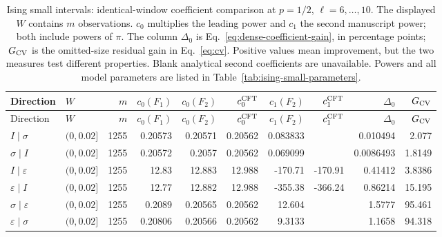 \begingroup\setlength{\tabcolsep}{2pt}
\begin{longtable}{llrrrrrrrr}
\caption{Ising small intervals: identical-window coefficient comparison at $p=1/2$, $\ell=6,\ldots,10$. The displayed $W$ contains $m$ observations. $c_0$ multiplies the leading power and $c_1$ the second manuscript power; both include powers of $\pi$. The column $\Delta_0$ is Eq.~\eqref{eq:dense-coefficient-gain}, in percentage points; $G_{\rm CV}$ is the omitted-size residual gain in Eq.~\eqref{eq:cv}. Positive values mean improvement, but the two measures test different properties. Blank analytical second coefficients are unavailable. Powers and all model parameters are listed in Table~\ref{tab:ising-small-parameters}.}
\label{tab:dense-small-ising}\\\toprule
Direction & $W$ & $m$ & $c_0(F_1)$ & $c_0(F_2)$ & $c_0^{\rm CFT}$ & $c_1(F_2)$ & $c_1^{\rm CFT}$ & $\Delta_0$ & $G_{\rm CV}$\\\midrule
\endfirsthead
\toprule
Direction & $W$ & $m$ & $c_0(F_1)$ & $c_0(F_2)$ & $c_0^{\rm CFT}$ & $c_1(F_2)$ & $c_1^{\rm CFT}$ & $\Delta_0$ & $G_{\rm CV}$\\\midrule
\endhead
\bottomrule\endfoot
$I\mid \sigma$ & $(0,0.02]$ & 1255 & 0.20573 & 0.20571 & 0.20562 & 0.083833 &  & 0.010494 & 2.077\\
$\sigma\mid I$ & $(0,0.02]$ & 1255 & 0.20572 & 0.2057 & 0.20562 & 0.069099 &  & 0.0086493 & 1.8149\\
$I\mid \varepsilon$ & $(0,0.02]$ & 1255 & 12.83 & 12.883 & 12.988 & -170.71 & -170.91 & 0.41412 & 3.8386\\
$\varepsilon\mid I$ & $(0,0.02]$ & 1255 & 12.77 & 12.882 & 12.988 & -355.38 & -366.24 & 0.86214 & 15.195\\
$\sigma\mid \varepsilon$ & $(0,0.02]$ & 1255 & 0.2089 & 0.20565 & 0.20562 & 12.604 &  & 1.5777 & 95.461\\
$\varepsilon\mid \sigma$ & $(0,0.02]$ & 1255 & 0.20806 & 0.20566 & 0.20562 & 9.3133 &  & 1.1658 & 94.318\\
\end{longtable}
\endgroup
